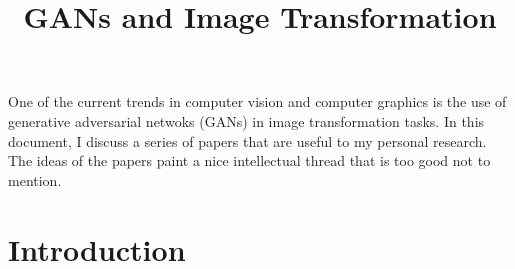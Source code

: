 \documentclass[10pt]{article}
\title{GANs and Image Transformation}
\begin{document}
  \maketitle

  One of the current trends in computer vision and computer graphics is the use of generative adversarial netwoks (GANs) in image transformation tasks. In this document, I discuss a series of papers \cite{Goodfellow:2014, Mizra:2014, Isola:2016, Zhu:2017, Choi:2017, Pumarola:2018} that are useful to my personal research. The ideas of the papers paint a nice intellectual thread that is too good not to mention.

  \section{Introduction}
\end{document}

